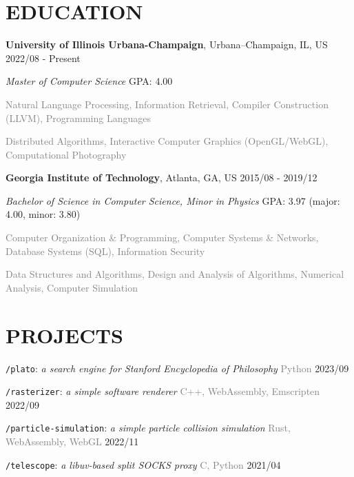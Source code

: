 \documentclass[10pt]{article}
\begin{document}
\section*{EDUCATION}
\textbf{University of Illinois Urbana-Champaign}, Urbana–Champaign, IL, US  \hfill 2022/08 - Present

\textit{Master of Computer Science}  \hfill GPA: 4.00

\vspace{0.5em}
\textcolor{gray}{Natural Language Processing, Information Retrieval, Compiler Construction (LLVM), Programming Languages}

\textcolor{gray}{Distributed Algorithms, Interactive Computer Graphics (OpenGL/WebGL), Computational Photography}

\vspace{1em}
\textbf{Georgia Institute of Technology}, Atlanta, GA, US \hfill 2015/08 - 2019/12

\textit{Bachelor of Science in Computer Science, Minor in Physics} \hfill GPA: 3.97 (major: 4.00, minor: 3.80)

\vspace{0.5em}
\textcolor{gray}{Computer Organization \& Programming, Computer Systems \& Networks, Database Systems (SQL), Information Security}

\textcolor{gray}{Data Structures and Algorithms, Design and Analysis of Algorithms, Numerical Analysis, Computer Simulation}


\section*{PROJECTS}

\vspace{0.5em}
\texttt{/plato}: \textit{a search engine for Stanford Encyclopedia of Philosophy} \hfill \textcolor{gray}{Python} 2023/09

\vspace{0.5em}
\texttt{/rasterizer}: \textit{a simple software renderer} \hfill \textcolor{gray}{C++, WebAssembly, Emscripten} 2022/09

\vspace{0.5em}
\texttt{/particle-simulation}: \textit{a simple particle collision simulation} \hfill \textcolor{gray}{Rust, WebAssembly, WebGL}  2022/11

\vspace{0.5em}
\texttt{/telescope}: \textit{a libuv-based split SOCKS proxy} \hfill \textcolor{gray}{C, Python}  2021/04
\end{document}
